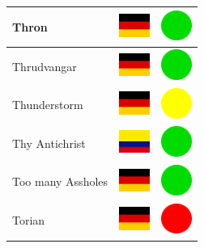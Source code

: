 \documentclass[12pt, a4paper, twoside]{report}
\begin{document}
\begin{center}
\begin{longtable}{|p{5cm}|p{2cm}|p{2cm}|}
Thron & \includegraphics[width=1cm]{4x3/de} & \includegraphics[width=1cm]{likes/y} \\ \hline
Thrudvangar & \includegraphics[width=1cm]{4x3/de} & \includegraphics[width=1cm]{likes/y} \\ \hline
Thunderstorm & \includegraphics[width=1cm]{4x3/de} & \includegraphics[width=1cm]{likes/m} \\ \hline
Thy Antichrist & \includegraphics[width=1cm]{4x3/co} & \includegraphics[width=1cm]{likes/y} \\ \hline
Too many Assholes & \includegraphics[width=1cm]{4x3/de} & \includegraphics[width=1cm]{likes/y} \\ \hline
Torian & \includegraphics[width=1cm]{4x3/de} & \includegraphics[width=1cm]{likes/n} \\ \hline

\end{longtable}
\end{center}
\end{document}
